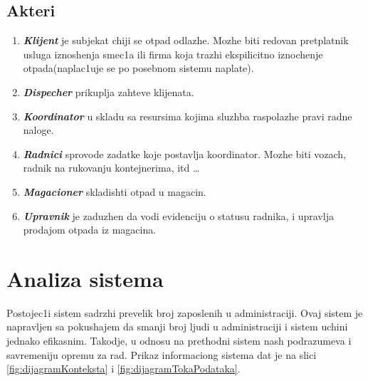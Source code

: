 \documentclass[10 pt]{article}
\begin{document}
\subsection{Akteri}
	\begin{enumerate}
		\item
			\textit{\textbf{Klijent}} je subjekat chiji se otpad odlazhe. Mozhe biti redovan pretplatnik usluga iznoshenja smec1a ili firma koja trazhi ekspilicitno iznochenje otpada(naplac1uje se po posebnom sistemu naplate).
		\item 
			\textit{\textbf{Dispecher}} prikuplja zahteve klijenata.
		\item 
			\textit{\textbf{Koordinator}} u skladu sa resursima kojima sluzhba raspolazhe pravi radne naloge.
		\item 
			\textit{\textbf{Radnici}} sprovode zadatke koje postavlja koordinator. Mozhe biti vozach, radnik na rukovanju kontejnerima, itd …
		\item 
			\textit{\textbf{Magacioner}} skladishti otpad u magacin. 
		\item
			\textit{\textbf{Upravnik}} je zaduzhen da vodi evidenciju o statusu radnika, i upravlja prodajom otpada iz magacina.
	\end{enumerate}


\section{Analiza sistema}
\setlength{\parindent}{30pt} Postojec1i sistem sadrzhi prevelik broj zaposlenih u administraciji. Ovaj sistem je napravljen sa pokushajem da smanji broj ljudi u administraciji i sistem uchini jednako efikasnim. Takodje, u odnosu na prethodni sistem nash podrazumeva i savremeniju opremu za rad. Prikaz informaciong sistema dat je na slici \ref{fig:dijagramKonteksta} i \ref{fig:dijagramTokaPodataka}. 
\end{document}
